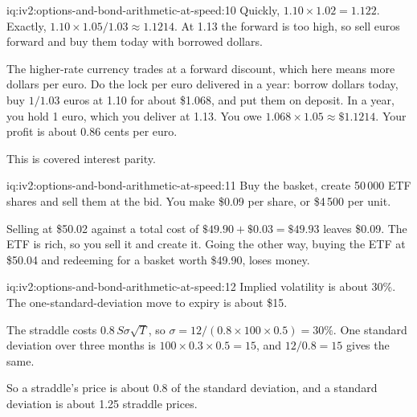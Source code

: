 \begin{solution}{iq:iv2:options-and-bond-arithmetic-at-speed:10}
Quickly, $1.10 \times 1.02 = 1.122$. Exactly, $1.10 \times 1.05/1.03 \approx 1.1214$. At 1.13 the forward is too high, so sell euros forward and buy them today with borrowed dollars.

The higher-rate currency trades at a forward discount, which here means more dollars per euro. Do the lock per euro delivered in a year: borrow dollars today, buy $1/1.03$ euros at 1.10 for about \$1.068, and put them on deposit. In a year, you hold 1 euro, which you deliver at 1.13. You owe $1.068 \times 1.05 \approx \$1.1214$. Your profit is about 0.86 cents per euro.

This is covered interest parity.

\end{solution}

\begin{solution}{iq:iv2:options-and-bond-arithmetic-at-speed:11}
Buy the basket, create 50\,000 ETF shares and sell them at the bid. You make \$0.09 per share, or \$4\,500 per unit.

Selling at \$50.02 against a total cost of $\$49.90 + \$0.03 = \$49.93$ leaves \$0.09. The ETF is rich, so you sell it and create it. Going the other way, buying the ETF at \$50.04 and redeeming for a basket worth \$49.90, loses money.

\end{solution}

\begin{solution}{iq:iv2:options-and-bond-arithmetic-at-speed:12}
Implied volatility is about 30\%. The one-standard-deviation move to expiry is about \$15.

The straddle costs $0.8\,S\sigma\sqrt T$, so $\sigma = 12/(0.8 \times 100 \times 0.5) = 30\%$. One standard deviation over three months is $100 \times 0.3 \times 0.5 = 15$, and $12/0.8 = 15$ gives the same.

So a straddle's price is about 0.8 of the standard deviation, and a standard deviation is about 1.25 straddle prices.

\end{solution}


